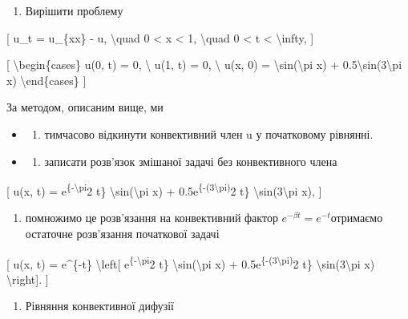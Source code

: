 \documentclass[
]{article}
\providecommand{\tightlist}{%
  \setlength{\itemsep}{0pt}\setlength{\parskip}{0pt}}
\begin{document}
\begin{enumerate}
\def\labelenumi{\arabic{enumi}.}
\tightlist
\item
  Вирішити проблему
\end{enumerate}

{[} u\_t = u\_\{xx\} - u, \textbackslash quad 0 \textless{} x
\textless{} 1, \textbackslash quad 0 \textless{} t \textless{}
\textbackslash infty, {]}

{[} \textbackslash begin\{cases\} u(0, t) = 0, \textbackslash{} u(1, t)
= 0, \textbackslash{} u(x, 0) = \textbackslash sin(\textbackslash pi x)
+ 0.5\textbackslash sin(3\textbackslash pi x)
\textbackslash end\{cases\} {]}

За методом, описаним вище, ми

\begin{itemize}
\tightlist
\item
  \begin{enumerate}
  \def\labelenumi{\alph{enumi})}
  \tightlist
  \item
    тимчасово відкинути конвективний член u у початковому рівнянні.
  \end{enumerate}
\item
  \begin{enumerate}
  \def\labelenumi{\alph{enumi})}
  \setcounter{enumi}{1}
  \tightlist
  \item
    записати розв'язок змішаної задачі без конвективного члена
  \end{enumerate}
\end{itemize}

{[} u(x, t) = e\textsuperscript{\{-\textbackslash pi}2 t\}
\textbackslash sin(\textbackslash pi x) +
0.5e\textsuperscript{\{-(3\textbackslash pi)}2 t\}
\textbackslash sin(3\textbackslash pi x), {]}

\begin{enumerate}
\def\labelenumi{\alph{enumi})}
\setcounter{enumi}{2}
\tightlist
\item
  помножимо це розв'язання на конвективний фактор
  \(e^{-\beta t}=e^{-t}\)отримаємо остаточне розв'язання початкової
  задачі
\end{enumerate}

{[} u(x, t) = e\^{}\{-t\} \textbackslash left{[}
e\textsuperscript{\{-\textbackslash pi}2 t\}
\textbackslash sin(\textbackslash pi x) +
0.5e\textsuperscript{\{-(3\textbackslash pi)}2 t\}
\textbackslash sin(3\textbackslash pi x) \textbackslash right{]}. {]}

\begin{enumerate}
\def\labelenumi{\arabic{enumi}.}
\setcounter{enumi}{1}
\tightlist
\item
  Рівняння конвективної дифузії
\end{enumerate}
\end{document}
